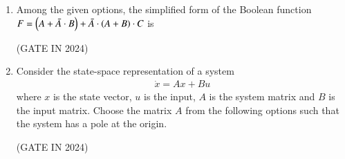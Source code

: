 \documentclass[journal,12pt,onecolumn]{IEEEtran}
\theoremstyle{remark}
\begin{document}
\begin{enumerate}
    \item Among the given options, the simplified form of the Boolean function $F = \left(A + \bar{A} \cdot B\right) + \bar{A} \cdot \left(A+B\right) \cdot C$ is

    \hfill{(GATE IN 2024)}
    \begin{enumerate}
    \end{enumerate}
    
    \item Consider the state-space representation of a system
    \begin{align*}
        \dot{x} = Ax + Bu
    \end{align*}
    where $x$ is the state vector, $u$ is the input, $A$ is the system matrix and $B$ is the input matrix. Choose the matrix $A$ from the following options such that the system has a pole at the origin.
    
    \hfill{(GATE IN 2024)}
    \begin{enumerate}
    \end{enumerate}


\end{enumerate}
\end{document}
